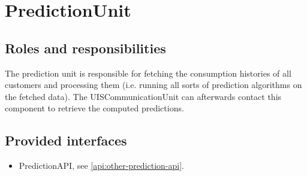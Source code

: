 \section{PredictionUnit}
\label{element:prediction-unit}

\subsection{Roles and responsibilities}

\npar The prediction unit is responsible for fetching the consumption
histories of all customers and processing them (i.e. running all sorts of
prediction algorithms on the fetched data). The UISCommunicationUnit can
afterwards contact this component to retrieve the computed predictions.

\subsection{Provided interfaces}

\begin{itemize}
  \item PredictionAPI, see \ref{api:other-prediction-api}.
\end{itemize}